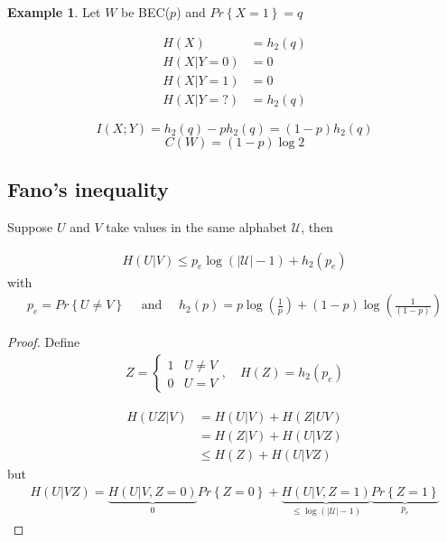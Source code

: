 \documentclass{article}
\theoremstyle{definition} %
\newtheorem{example}{Example}
\renewcommand{\Pr}[1]{Pr\left\{#1\right\}}
\def\U{\mathcal{U}}
\begin{document}
\begin{example}
  Let $W$ be BEC($p$) and $\Pr{X=1} = q$

  \begin{align*}
    H(X) &= h_2(q)
\\    H(X|Y=0) &= 0\\
    H(X|Y=1) &= 0\\
    H(X|Y=?) &= h_2(q)
  \end{align*}

  \[
    I(X;Y) = h_2(q) - ph_2(q) = (1-p)h_2(q)
  \]
  \[
    C(W) = (1-p)\log 2
  \]
\end{example}


\subsection{Fano's inequality}
Suppose $U$ and $V$ take values in the same alphabet $\U$, then

\begin{align*}
  H(U | V) \leq p_e \log(|\U| - 1) + h_2(p_e)
\end{align*}
with
\begin{align*}
  p_e = \Pr{U \neq V}
  \quad \text{ and } \quad
  h_2(p) = p \log(\frac{1}{p}) + (1 - p) \log(\frac{1}{(1-p)})
\end{align*}

\begin{proof}
  Define
  \begin{align*}
    Z =
    \left\{
    \begin{array}{ll}
      1 & U \neq V \\
      0 & U = V
    \end{array}
    \right. , \quad
    H(Z) = h_2(p_e)
  \end{align*}

  \begin{align*}
    H(UZ | V) &= H(U|V) + H(Z | UV) \\
    &= H(Z | V) + H(U | VZ) \\
    &\leq H(Z) + H(U | VZ)
  \end{align*}
  but
  \begin{align*}
    H(U | VZ) = \underbrace{H(U | V, Z = 0)}_{0}\Pr{Z = 0} + \underbrace{H(U | V, Z = 1)}_{\leq \log(|\U| - 1)}\underbrace{\Pr{Z = 1}}_{p_e}
  \end{align*}
\end{proof}
\end{document}
